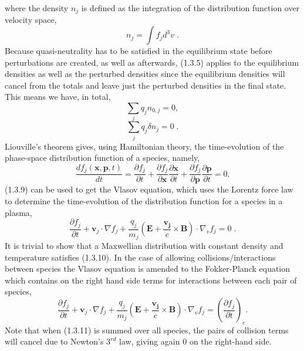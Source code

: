 \documentclass[12pt]{article}
\numberwithin{equation}{subsection}
\begin{document}
where the density $n_j$ is defined as the integration of the distribution function over velocity space,
   \begin{equation}
      n_j = \int f_j d^{3}v\;.
   \end{equation}
Because quasi-neutrality has to be satisfied in the equilibrium state before perturbations are created, as well as
afterwards, (1.3.5) applies to the equilibrium densities as well as the perturbed densities since the equilibrium
densities will cancel from the totals and leave just the perturbed densities in the final state. This means we have,
in total,
   \begin{equation}
      \sum\limits_{j}q_jn_{0,j} = 0,
   \end{equation}
   \begin{equation}
      \sum\limits_{j}q_j\delta n_j = 0\;.
   \end{equation}
   \quad Liouville's theorem gives, using Hamiltonian theory, the time-evolution of the phase-space distribution function of a species,
namely\cite{WessonC},
   \begin{equation}
      \frac{df_j(\bm{x},\bm{p},t)}{dt} = \frac{\partial f_j}{\partial t}
                                       + \frac{\partial f_j}{\partial \bm{x}}\frac{\partial \bm{x}}{\partial t}
                                       + \frac{\partial f_j}{\partial \bm{p}}\frac{\partial \bm{p}}{\partial t} = 0.                     
   \end{equation}
(1.3.9) can be used to get the Vlasov equation\cite{WessonC}, which uses the Lorentz force law to determine the time-evolution
of the distribution function for a species in a plasma,
   \begin{equation}
      \frac{\partial f_j}{\partial t} + \bm{v}_j\cdot\nabla f_j + \frac{q_j}{m_j}(\bm{E} + \frac{\bm{v_j}}{c}\times\bm{B})\cdot\nabla_v f_j = 0\;.
   \end{equation}
It is trivial to show that a Maxwellian distribution with constant density and temperature satisfies (1.3.10). In the case of allowing collisions/interactions between species the
Vlasov equation is amended to the Fokker-Planck equation which contains on the right hand side terms for interactions between each pair of species\cite{WessonC},
   \begin{equation}
      \frac{\partial f_j}{\partial t} + \bm{v}_j\cdot\nabla f_j
      + \frac{q_j}{m_j}(\bm{E} + \frac{\bm{v_j}}{c}\times\bm{B})\cdot\nabla_v f_j = \left(\frac{\partial f_j}{\partial t}\right)_c.
   \end{equation}
Note that when (1.3.11) is summed over all species, the pairs of collision terms will cancel due to Newton's $3^{rd}$ law,
giving again $0$ on the right-hand side.
\end{document}
